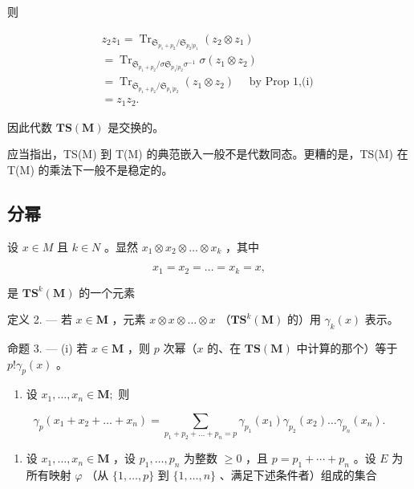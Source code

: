 则

\[
\begin{array}{l} z _ {2} z _ {1} = \operatorname{Tr} _ {\mathfrak {S} _ {p _ {1} + p _ {2}} / \mathfrak {S} _ {p _ {2} | p _ {1}}} (z _ {2} \otimes z _ {1}) \\ = \operatorname{Tr} _ {\mathfrak {S} _ {p _ {1} + p _ {2}} / \sigma \mathfrak {S} _ {p _ {1} | p _ {2}} \sigma^ {- 1}} \sigma (z _ {1} \otimes z _ {2}) \\ = \operatorname{Tr} _ {\mathfrak {S} _ {p _ {1} + p _ {2}} / \mathfrak {S} _ {p _ {1} | p _ {2}}} (z _ {1} \otimes z _ {2}) \quad \text { by   Prop   1,(i) } \\ = z _ {1} z _ {2}. \end{array}
\]

因此代数 \(\mathbf{TS}(\mathbf{M})\) 是交换的。

应当指出，TS(M) 到 T(M) 的典范嵌入一般不是代数同态。更糟的是，TS(M) 在 T(M) 的乘法下一般不是稳定的。

\subsection{分幂}

设 \(x \in M\) 且 \(k \in N\) 。显然 \(x_1 \otimes x_2 \otimes \ldots \otimes x_k\) ，其中

\[
x _ {1} = x _ {2} = \dots = x _ {k} = x,
\]

是 \(\mathbf{TS}^k (\mathbf{M})\) 的一个元素

定义 2. --- 若 \(x \in \mathbf{M}\) ，元素 \(x \otimes x \otimes \ldots \otimes x\) （\(\mathbf{T}\mathbf{S}^k(\mathbf{M})\) 的）用 \(\gamma_k(x)\) 表示。

命题 3. --- (i) 若 \(x \in \mathbf{M}\) ，则 \(p\) 次幂（\(x\) 的、在 \(\mathbf{T}\mathbf{S}(\mathbf{M})\) 中计算的那个）等于 \(p! \gamma_p(x)\) 。

\begin{enumerate}
\def\labelenumi{(\roman{enumi})}
\setcounter{enumi}{1}
\tightlist
\item
  设 \(x_{1},\ldots ,x_{n}\in \mathbf{M};\) 则
\end{enumerate}

\[
\gamma_ {p} \left(x _ {1} + x _ {2} + \dots + x _ {n}\right) = \sum_ {p _ {1} + p _ {2} + \dots + p _ {n} = p} \gamma_ {p _ {1}} \left(x _ {1}\right) \gamma_ {p _ {2}} \left(x _ {2}\right) \dots \gamma_ {p _ {n}} \left(x _ {n}\right).
\]

\begin{enumerate}
\def\labelenumi{(\roman{enumi})}
\setcounter{enumi}{2}
\tightlist
\item
  设 \(x_1, \ldots, x_n \in \mathbf{M}\) ，设 \(p_1, \ldots, p_n\) 为整数 \(\geqslant 0\) ，且 \(p = p_1 + \cdots + p_n\) 。设 \(E\) 为所有映射 \(\varphi\) （从 \(\{1, \ldots, p\}\) 到 \(\{1, \ldots, n\}\) 、满足下述条件者）组成的集合
\end{enumerate}

